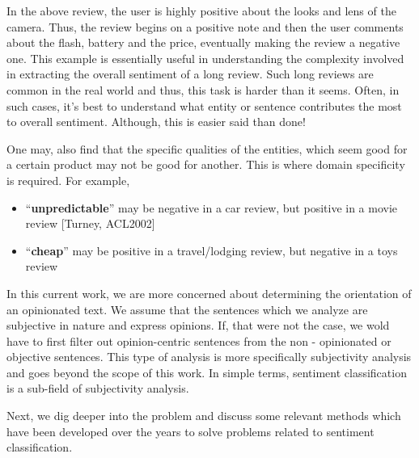 In the above review, the user is highly positive about the looks and lens of the camera. Thus, the review begins on a positive note and then the user comments about the flash, battery and the price, eventually making the review a negative one. This example is essentially useful in understanding the complexity involved in extracting the overall sentiment of a long review. Such long reviews are common in the real world and thus, this task is harder than it seems. Often, in such cases, it's best to understand what entity or sentence contributes the most to overall sentiment. Although, this is easier said than done! 

One may, also find that the specific qualities of the entities, which seem good for a certain product may not be good for another. This is where domain specificity is required. For example,
\begin{itemize}
\item  “\textbf{unpredictable}” may be negative in a car review, but positive in a movie review [Turney, ACL2002]
\item “\textbf{cheap}” may be positive in a travel/lodging review, but negative in a toys review
\end{itemize}

In this current work, we are more concerned about determining the orientation of an opinionated text. We assume that the sentences which we analyze are subjective in nature and express opinions. If, that were not the case, we wold have to first filter out opinion-centric sentences from the non - opinionated or objective sentences. This type of analysis is more specifically subjectivity analysis and goes beyond the scope of this work. In simple terms, sentiment classification is a sub-field of subjectivity analysis.

Next, we dig deeper into the problem and discuss some relevant methods which have been developed over the years to solve problems related to sentiment classification.   